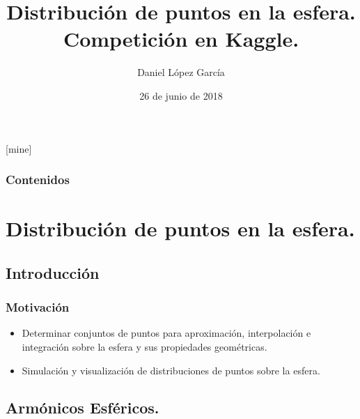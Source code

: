 \documentclass{beamer}
\title[Distribución de puntos en la esfera.Competición en Kaggle.]{Distribución de puntos en la esfera.\\ Competición en Kaggle.} %
\author{Daniel López García} %
\institute[UGR] %
{
  Universidad de Granada \\ %
}
\date{26 de junio de 2018} %
\theoremstyle{plain}
\theoremstyle{definition}
\theoremstyle{plain}
\theoremstyle{definition}
\theoremstyle{remark}
\theoremstyle{definition}
\begin{document}
\theoremstyle{definition}
[mine]

\frame{\titlepage}

\begin{frame}
  \frametitle{Contenidos} %
  \tableofcontents
\end{frame}



\section{Distribución de puntos en la esfera.} %
\subsection{Introducción}
\begin{frame}
	\frametitle{Motivación}
	\begin{itemize}
		\item Determinar conjuntos de puntos
		para aproximación, interpolación e integración sobre la esfera y sus propiedades geométricas.
		\item Simulación y visualización de distribuciones de puntos sobre la esfera.
	\end{itemize}
	
\end{frame}
\subsection{Armónicos Esféricos.}
	
\end{document}
